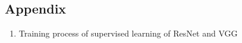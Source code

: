 \documentclass[lang=english,inputenc=utf8,fontsize=10pt]{ldvarticle}
\begin{document}
\newpage
\begin{appendices}
\section{Appendix}
\begin{center}
\begin{enumerate}
    \item Training process of supervised learning of ResNet and VGG
        \begin{figure}[h]
        \centering
\end{figure}
\end{enumerate}
\end{center}
\end{appendices}
\end{document}
